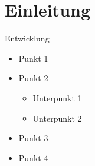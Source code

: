 \section{Einleitung}

\begin{frame}{Entwicklung}

        \begin{itemize}
        \item Punkt 1
        \item Punkt 2
                \begin{itemize}
                \item Unterpunkt 1
                \item Unterpunkt 2
                \end{itemize}
        \item Punkt 3
        \item Punkt 4
        \end{itemize}

\end{frame}

